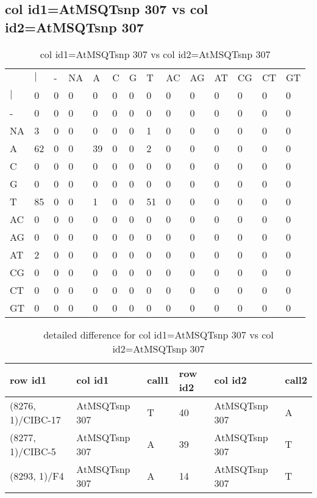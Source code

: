 \subsection{col id1=AtMSQTsnp 307 vs col id2=AtMSQTsnp 307}
\begin{center}
\begin{longtable}{|l|l|l|l|l|l|l|l|l|l|l|l|l|l|}
\caption{col id1=AtMSQTsnp 307 vs col id2=AtMSQTsnp 307} \label{table_dm652}\\
\hline
\\
\hline
&$|$&-&NA&A&C&G&T&AC&AG&AT&CG&CT&GT\\
$|$&0&0&0&0&0&0&0&0&0&0&0&0&0\\
-&0&0&0&0&0&0&0&0&0&0&0&0&0\\
NA&3&0&0&0&0&0&1&0&0&0&0&0&0\\
A&62&0&0&39&0&0&2&0&0&0&0&0&0\\
C&0&0&0&0&0&0&0&0&0&0&0&0&0\\
G&0&0&0&0&0&0&0&0&0&0&0&0&0\\
T&85&0&0&1&0&0&51&0&0&0&0&0&0\\
AC&0&0&0&0&0&0&0&0&0&0&0&0&0\\
AG&0&0&0&0&0&0&0&0&0&0&0&0&0\\
AT&2&0&0&0&0&0&0&0&0&0&0&0&0\\
CG&0&0&0&0&0&0&0&0&0&0&0&0&0\\
CT&0&0&0&0&0&0&0&0&0&0&0&0&0\\
GT&0&0&0&0&0&0&0&0&0&0&0&0&0\\
\hline
\end{longtable}
\end{center}

\begin{center}
\begin{longtable}{|l|l|l|l|l|l|}
\caption{detailed difference for col id1=AtMSQTsnp 307 vs col id2=AtMSQTsnp 307} \label{table_dm653}\\
\hline
row id1&col id1&call1&row id2&col id2&call2\\
\hline
(8276, 1)/CIBC-17&AtMSQTsnp 307&T&40&AtMSQTsnp 307&A\\
(8277, 1)/CIBC-5&AtMSQTsnp 307&A&39&AtMSQTsnp 307&T\\
(8293, 1)/F4&AtMSQTsnp 307&A&14&AtMSQTsnp 307&T\\
\hline
\end{longtable}
\end{center}

